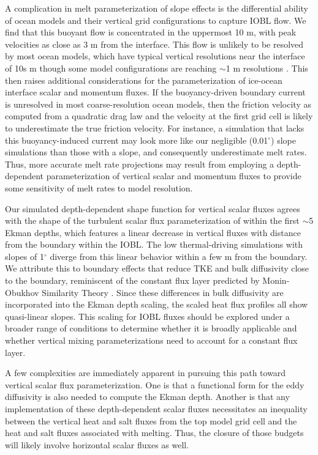 \documentclass[draft]{agujournal2019}
\begin{document}
A complication in melt parameterization of slope effects is the differential ability of ocean models and their vertical grid configurations to capture IOBL flow. We find that this buoyant flow is concentrated in the uppermost 10 m, with peak velocities as close as 3 m from the interface. This flow is unlikely to be resolved by most ocean models, which have typical vertical resolutions near the interface of 10s m though some model configurations are reaching $\sim\!$1 m resolutions \cite{gwyther_cold_2020}. This then raises additional considerations for the parameterization of ice-ocean interface scalar and momentum fluxes. If the buoyancy-driven boundary current is unresolved in most coarse-resolution ocean models, then the friction velocity as computed from a quadratic drag law and the velocity at the first grid cell is likely to underestimate the true friction velocity. For instance, a simulation that lacks this buoyancy-induced current may look more like our negligible (0.01$^{\circ}$) slope simulations than those with a slope, and consequently underestimate melt rates. Thus, more accurate melt rate projections may result from employing a depth-dependent parameterization of vertical scalar and momentum fluxes to provide some sensitivity of melt rates to model resolution. 

Our simulated depth-dependent shape function for vertical scalar fluxes agrees with the shape of the turbulent scalar flux parameterization of  within the first $\sim\!$5 Ekman depths, which features a linear decrease in vertical fluxes with distance from the boundary within the IOBL. The low thermal-driving simulations with slopes of 1$^{\circ}$ diverge from this linear behavior within a few m from the boundary. We attribute this to boundary effects that reduce TKE and bulk diffusivity close to the boundary, reminiscent of the constant flux layer predicted by Monin-Obukhov Similarity Theory \cite{monin_basic_1954}. Since these differences in bulk diffusivity are incorporated into the Ekman depth scaling, the scaled heat flux profiles all show quasi-linear slopes. This scaling for IOBL fluxes should be explored under a broader range of conditions to determine whether it is broadly applicable and whether vertical mixing parameterizations need to account for a constant flux layer. 

A few complexities are immediately apparent in pursuing this path toward vertical scalar flux parameterization. One is that a functional form for the eddy diffusivity is also needed to compute the Ekman depth. Another is that any implementation of these depth-dependent scalar fluxes necessitates an inequality between the vertical heat and salt fluxes from the top model grid cell and the heat and salt fluxes associated with melting. Thus, the closure of those budgets will likely involve horizontal scalar fluxes as well.
\end{document}
